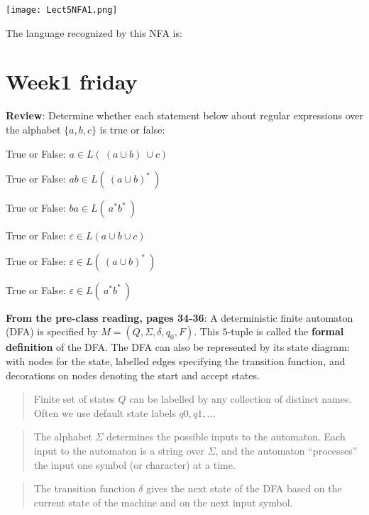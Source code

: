 \documentclass[12pt, oneside]{article}
\begin{document}
\texttt{[image: Lect5NFA1.png]}


\vspace{-10pt}

The language recognized by this NFA is:  \vfill
\section*{Week1 friday}


{\bf Review}: Determine whether each statement below about regular expressions
over the alphabet $\{a,b,c\}$ is true or false:
   
True or False: \qquad 
   $a  \in L(~(a \cup b )~\cup c)$

True or False: \qquad 
   $ab  \in L(~ (a \cup b)^*  ~)$
   
True or False: \qquad    
   $ba \in L( ~ a^* b^* ~)$
   
True or False: \qquad 
   $\varepsilon  \in L(a \cup b \cup c)$
   
True or False: \qquad 
   $\varepsilon  \in L(~ (a \cup b)^*  ~)$

True or False: \qquad 
   $\varepsilon \in L( ~ a^* b^* ~)$


{\bf From the pre-class reading, pages 34-36}:
A deterministic finite automaton (DFA) is specified by  $M = (Q, \Sigma, \delta, q_0, F)$.
This $5$-tuple is called the {\bf formal definition} of the DFA. The DFA can also 
be represented by its state diagram: with nodes for the state, labelled edges specifying the 
transition function, and decorations on nodes denoting the start and accept states.

\begin{quote}
Finite set of states $Q$ can be labelled by any collection of distinct names. Often
we use default state labels $q0, q1, \ldots$ 
\end{quote}

\begin{quote}  
The alphabet $\Sigma$ determines the possible inputs to the automaton. 
Each input to the automaton is a string over  $\Sigma$, and the automaton ``processes'' the input
one symbol (or character) at a time.
\end{quote}

\begin{quote}
The transition function $\delta$ gives the next state of the DFA based on the current state of 
the machine and on the next input symbol.
\end{quote}
\end{document}
